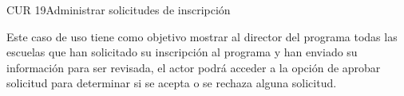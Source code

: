 \begin{UseCase}{CUR 19}{Administrar solicitudes de inscripción}
	{
		Este caso de uso tiene como objetivo mostrar al director del programa todas las escuelas que han solicitado su inscripción al programa y han enviado su información para ser revisada, el actor podrá acceder a la opción de aprobar solicitud para determinar si se acepta o se rechaza alguna solicitud.

    }
    


\end{UseCase}
